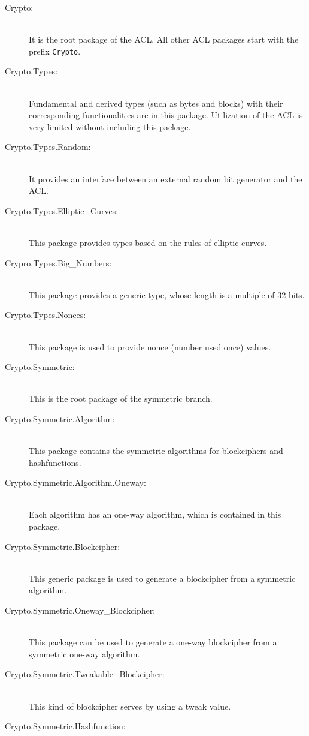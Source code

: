 \begin{description}
\item[Crypto:]\ \\
  It is the root package of the ACL. All other ACL packages start with the prefix \texttt{Crypto}.
\item[Crypto.Types:] \ \\
  Fundamental and derived types (such as bytes and blocks) with their corresponding functionalities are in this package. Utilization of the ACL is very limited without including this package.
\item[Crypto.Types.Random:] \ \\
  It provides an interface between an external random bit generator and the ACL.
\item[Crypto.Types.Elliptic\_Curves:] \ \\
  This package provides types based on the rules of elliptic curves.
\item[Crypro.Types.Big\_Numbers:] \ \\
  This package provides a generic type, whose length is a multiple of 32 bits.
\item[Crypto.Types.Nonces:] \ \\
  This package is used to provide nonce (number used once) values.
\item[Crypto.Symmetric:]\ \\
  This is the root package of the symmetric branch.
\item[Crypto.Symmetric.Algorithm:]\ \\
  This package contains the symmetric algorithms for blockciphers and hashfunctions.
\item[Crypto.Symmetric.Algorithm.Oneway:]\ \\
  Each algorithm has an one-way algorithm, which is contained in this package. 
\item[Crypto.Symmetric.Blockcipher:]\ \\
  This generic package is used to generate a blockcipher from a symmetric algorithm.
\item[Crypto.Symmetric.Oneway\_Blockcipher:]\ \\
  This package can be used to generate a one-way blockcipher from a
  symmetric one-way algorithm.
\item[Crypto.Symmetric.Tweakable\_Blockcipher:] \ \\
  This kind of blockcipher serves by using a tweak value.
\item[Crypto.Symmetric.Hashfunction:] \ \\

\end{description}
